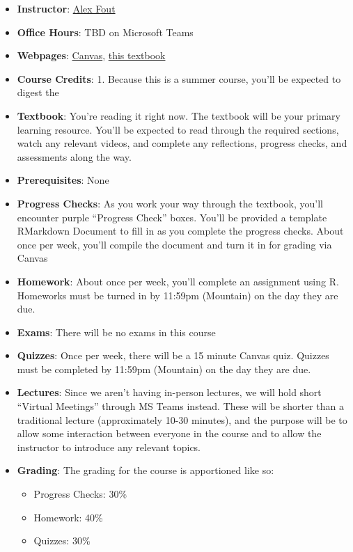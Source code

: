 \documentclass[
]{article}
\providecommand{\tightlist}{%
  \setlength{\itemsep}{0pt}\setlength{\parskip}{0pt}}
\begin{document}
\begin{itemize}
\item
  \textbf{Instructor}: \href{mailto:fout@colostate.edu}{Alex Fout}
\item
  \textbf{Office Hours}: TBD on Microsoft Teams
\item
  \textbf{Webpages}: \href{https://canvas.colostate.edu}{Canvas}, \href{https://csu-r.github.io/Module1/}{this textbook}
\item
  \textbf{Course Credits}: 1. Because this is a summer course, you'll be expected to digest the
\item
  \textbf{Textbook}: You're reading it right now. The textbook will be your primary learning resource. You'll be expected to read through the required sections, watch any relevant videos, and complete any reflections, progress checks, and assessments along the way.
\item
  \textbf{Prerequisites}: None
\item
  \textbf{Progress Checks}: As you work your way through the textbook, you'll encounter purple ``Progress Check'' boxes. You'll be provided a template RMarkdown Document to fill in as you complete the progress checks. About once per week, you'll compile the document and turn it in for grading via Canvas
\item
  \textbf{Homework}: About once per week, you'll complete an assignment using R. Homeworks must be turned in by 11:59pm (Mountain) on the day they are due.
\item
  \textbf{Exams}: There will be no exams in this course
\item
  \textbf{Quizzes}: Once per week, there will be a 15 minute Canvas quiz. Quizzes must be completed by 11:59pm (Mountain) on the day they are due.
\item
  \textbf{Lectures}: Since we aren't having in-person lectures, we will hold short ``Virtual Meetings'' through MS Teams instead. These will be shorter than a traditional lecture (approximately 10-30 minutes), and the purpose will be to allow some interaction between everyone in the course and to allow the instructor to introduce any relevant topics.
\item
  \textbf{Grading}: The grading for the course is apportioned like so:

  \begin{itemize}
  \tightlist
  \item
    Progress Checks: 30\%
  \item
    Homework: 40\%
  \item
    Quizzes: 30\%
  \end{itemize}
\end{itemize}
\end{document}
